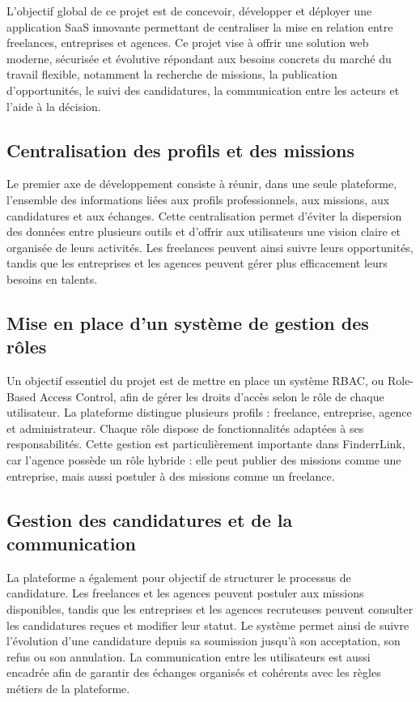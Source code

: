 L'objectif global de ce projet est de concevoir, développer et déployer une application SaaS innovante permettant de centraliser la mise en relation entre freelances, entreprises et agences. Ce projet vise à offrir une solution web moderne, sécurisée et évolutive répondant aux besoins concrets du marché du travail flexible, notamment la recherche de missions, la publication d'opportunités, le suivi des candidatures, la communication entre les acteurs et l'aide à la décision.

\subsection{Centralisation des profils et des missions}

Le premier axe de développement consiste à réunir, dans une seule plateforme, l'ensemble des informations liées aux profils professionnels, aux missions, aux candidatures et aux échanges. Cette centralisation permet d'éviter la dispersion des données entre plusieurs outils et d'offrir aux utilisateurs une vision claire et organisée de leurs activités. Les freelances peuvent ainsi suivre leurs opportunités, tandis que les entreprises et les agences peuvent gérer plus efficacement leurs besoins en talents.

\subsection{Mise en place d'un système de gestion des rôles}

Un objectif essentiel du projet est de mettre en place un système RBAC, ou Role-Based Access Control, afin de gérer les droits d'accès selon le rôle de chaque utilisateur. La plateforme distingue plusieurs profils : freelance, entreprise, agence et administrateur. Chaque rôle dispose de fonctionnalités adaptées à ses responsabilités. Cette gestion est particulièrement importante dans FinderrLink, car l'agence possède un rôle hybride : elle peut publier des missions comme une entreprise, mais aussi postuler à des missions comme un freelance.

\subsection{Gestion des candidatures et de la communication}

La plateforme a également pour objectif de structurer le processus de candidature. Les freelances et les agences peuvent postuler aux missions disponibles, tandis que les entreprises et les agences recruteuses peuvent consulter les candidatures reçues et modifier leur statut. Le système permet ainsi de suivre l'évolution d'une candidature depuis sa soumission jusqu'à son acceptation, son refus ou son annulation. La communication entre les utilisateurs est aussi encadrée afin de garantir des échanges organisés et cohérents avec les règles métiers de la plateforme.

